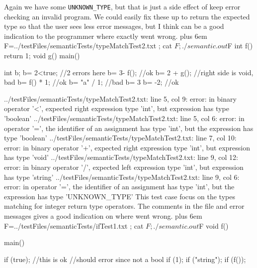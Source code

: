 \documentclass{article}
\makeatletter
\newenvironment{myverb}
 {\def\@xobeysp{\ }\verbatim\rightskip=0pt plus 6em\relax}
 {\endverbatim}
\makeatother
\begin{document}
\begin{itemize}
Again we have some \verb|UNKNOWN_TYPE|, but that is just a side effect of keep error checking an invalid program. We could easily fix these up to return the expected type so that the user sees less error messages, but I think can be a good indication to the programmer where exactly went wrong.
\begin{myverb}
F=../testFiles/semanticTests/typeMatchTest2.txt ; cat $F; ./semantic.out $F
int f(){ return 1;}
void g(){}
main(){
    int b;
    b= 2<true; //2 errors here
    b= 3- f(); //ok
    b= 2 + g(); //right side is void, bad
    b= f() * 1; //ok
    b= "a" / 1; //bad
    b= 3  %
    b= -2; //ok

}
../testFiles/semanticTests/typeMatchTest2.txt: line 5, col 9: error: in binary operator '<', expected right expression type 'int', but expression has type 'boolean'
../testFiles/semanticTests/typeMatchTest2.txt: line 5, col 6: error: in operator '=', the identifier of an assignment has type 'int', but the expression has type 'boolean'
../testFiles/semanticTests/typeMatchTest2.txt: line 7, col 10: error: in binary operator '+', expected right expression type 'int', but expression has type 'void'
../testFiles/semanticTests/typeMatchTest2.txt: line 9, col 12: error: in binary operator '/', expected left expression type 'int', but expression has type 'string'
../testFiles/semanticTests/typeMatchTest2.txt: line 9, col 6: error: in operator '=', the identifier of an assignment has type 'int', but the expression has type 'UNKNOWN_TYPE'
\end{myverb}
This test case focus on the types matching for integer return type operators. The comments in the file and error messages gives a good indication on where went wrong.
\begin{myverb}
F=../testFiles/semanticTests/ifTest1.txt ; cat $F; ./semantic.out $F
void f(){}

main(){
    if (true); //this is ok
    //should error since not a bool
    if (1);
    if ("string");
    if (f());

}
\end{myverb}
\end{itemize}
\end{document}
